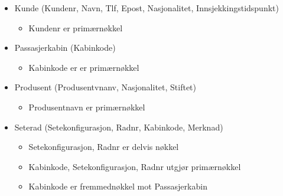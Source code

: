 \documentclass[a4paper,12pt]{article}
\begin{document}
\begin{itemize}
\item Kunde (Kundenr, Navn, Tlf, Epost, Nasjonalitet, Innsjekkingstidspunkt)
\begin{itemize}
\item Kundenr er primærnøkkel
\end{itemize}

\item Passasjerkabin (Kabinkode)
\begin{itemize}
\item Kabinkode er er primærnøkkel
\end{itemize}

\item Produsent (Produsentvnanv, Nasjonalitet, Stiftet)
\begin{itemize}
\item Produsentnavn er primærnøkkel
\end{itemize}

\item Seterad (Setekonfigurasjon, Radnr, Kabinkode, Merknad)
\begin{itemize}
\item Setekonfigurasjon, Radnr er delvis nøkkel
\item Kabinkode, Setekonfigurasjon, Radnr utgjør primærnøkkel
\item Kabinkode er fremmednøkkel mot Passasjerkabin 
\end{itemize}

\end{itemize}
\end{document}
